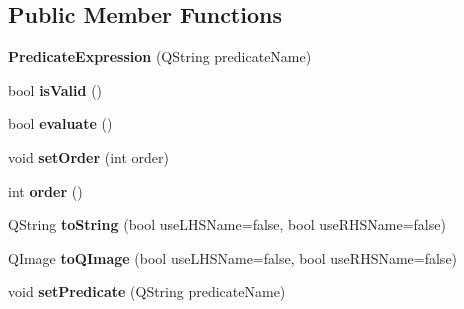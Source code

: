 \subsection*{Public Member Functions}
\begin{DoxyCompactItemize}
\item 
\hypertarget{class_picto_1_1_predicate_expression_a3166bb6d92a20c836119f978890c6e5a}{{\bfseries Predicate\-Expression} (Q\-String predicate\-Name)}\label{class_picto_1_1_predicate_expression_a3166bb6d92a20c836119f978890c6e5a}

\item 
\hypertarget{class_picto_1_1_predicate_expression_a24267663afbb174fd76f6ba4daae516d}{bool {\bfseries is\-Valid} ()}\label{class_picto_1_1_predicate_expression_a24267663afbb174fd76f6ba4daae516d}

\item 
\hypertarget{class_picto_1_1_predicate_expression_a972383d0f41e47d48a351662607cbc75}{bool {\bfseries evaluate} ()}\label{class_picto_1_1_predicate_expression_a972383d0f41e47d48a351662607cbc75}

\item 
\hypertarget{class_picto_1_1_predicate_expression_ae2645c2862bffbf23911cd4abef1dfba}{void {\bfseries set\-Order} (int order)}\label{class_picto_1_1_predicate_expression_ae2645c2862bffbf23911cd4abef1dfba}

\item 
\hypertarget{class_picto_1_1_predicate_expression_a5a5c2e97c26a6313ad69f753ef117a18}{int {\bfseries order} ()}\label{class_picto_1_1_predicate_expression_a5a5c2e97c26a6313ad69f753ef117a18}

\item 
\hypertarget{class_picto_1_1_predicate_expression_a2e77308059585b3e3ef1fd38a49caa65}{Q\-String {\bfseries to\-String} (bool use\-L\-H\-S\-Name=false, bool use\-R\-H\-S\-Name=false)}\label{class_picto_1_1_predicate_expression_a2e77308059585b3e3ef1fd38a49caa65}

\item 
\hypertarget{class_picto_1_1_predicate_expression_a2af5bbc34bc44ee734ae34ce8bf2e525}{Q\-Image {\bfseries to\-Q\-Image} (bool use\-L\-H\-S\-Name=false, bool use\-R\-H\-S\-Name=false)}\label{class_picto_1_1_predicate_expression_a2af5bbc34bc44ee734ae34ce8bf2e525}

\item 
\hypertarget{class_picto_1_1_predicate_expression_a603102c41ba138da30ccbd6a302d7316}{void {\bfseries set\-Predicate} (Q\-String predicate\-Name)}\label{class_picto_1_1_predicate_expression_a603102c41ba138da30ccbd6a302d7316}


\end{DoxyCompactItemize}
